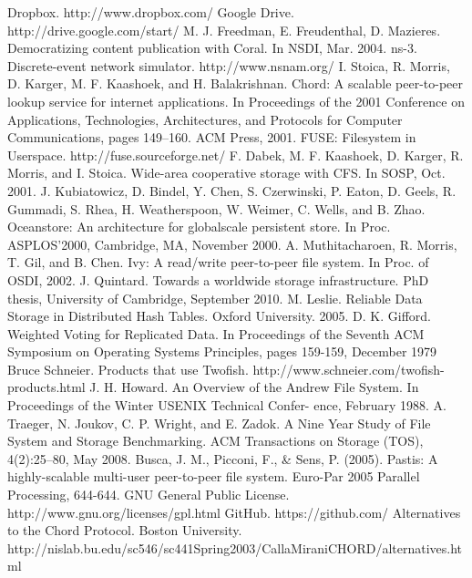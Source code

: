 \documentclass[8pt,a4paper]{article}
\begin{document}

\begin{thebibliography}{10}
Dropbox. http://www.dropbox.com/
Google Drive. http://drive.google.com/start/
M. J. Freedman, E. Freudenthal, D. Mazieres.
Democratizing content publication with Coral.
In NSDI, Mar. 2004.
ns-3. Discrete-event network simulator. http://www.nsnam.org/
I. Stoica, R. Morris, D. Karger, M. F. Kaashoek, and
H. Balakrishnan. Chord: A scalable peer-to-peer lookup
service for internet applications. In Proceedings of the 2001
Conference on Applications, Technologies, Architectures,
and Protocols for Computer Communications, pages
149–160. ACM Press, 2001.
FUSE: Filesystem in Userspace. http://fuse.sourceforge.net/ 
F. Dabek, M. F. Kaashoek, D. Karger, R. Morris, and I. Stoica. Wide-area
cooperative storage with CFS. In SOSP, Oct. 2001.
J. Kubiatowicz, D. Bindel, Y. Chen, S. Czerwinski, P. Eaton, D. Geels, R. Gummadi, S. Rhea,
H. Weatherspoon, W. Weimer, C. Wells, and B. Zhao. Oceanstore: An architecture for globalscale persistent store. In Proc. ASPLOS’2000, Cambridge, MA, November 2000.
A. Muthitacharoen, R. Morris, T. Gil, and B. Chen. 
Ivy: A read/write peer-to-peer file system. 
In Proc. of OSDI, 2002.
J. Quintard. Towards a worldwide storage infrastructure.
PhD thesis, University of Cambridge, September 2010.
M. Leslie.
Reliable Data Storage in Distributed Hash Tables. Oxford University. 2005.
D. K. Gifford. Weighted Voting for Replicated 
Data. In Proceedings of the Seventh ACM 
Symposium on Operating Systems Principles, 
pages 159-159, December 1979
Bruce Schneier. Products that use Twofish. http://www.schneier.com/twofish-products.html
J. H. Howard. An Overview of the Andrew File System.
In Proceedings of the Winter USENIX Technical Confer-
ence, February 1988.
A. Traeger, N. Joukov, C. P. Wright, and E. Zadok. A
Nine Year Study of File System and Storage Benchmarking. ACM Transactions on Storage (TOS), 4(2):25–80,
May 2008.
Busca, J. M., Picconi, F., \& Sens, P. (2005). Pastis: A highly-scalable multi-user peer-to-peer file system. Euro-Par 2005 Parallel Processing, 644-644.
GNU General Public License. http://www.gnu.org/licenses/gpl.html
GitHub. https://github.com/ 
Alternatives to the Chord Protocol. Boston University. http://nislab.bu.edu/sc546/sc441Spring2003/CallaMiraniCHORD/alternatives.html
\end{thebibliography}
\end{document}

